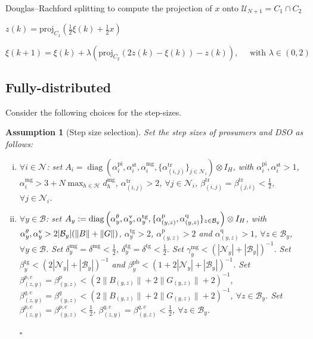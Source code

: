 \documentclass[10pt]{article}
\newtheorem{definitiox	n}{Definition}{\it}{}
\newtheorem{assumption}{Assumption}{\it}{}
\newcommand{\mc}{\mathcal}
\newcommand{\proj}{\mathrm{proj}}
\newcommand{\diag}{\operatorname{diag}}
\newcommand{\0}{\mathbf{0}}
\newcommand{\1}{\mathbf{1}}
\begin{document}
\begin{algorithm}[]
\caption{Douglas--Rachford splitting to compute the projection of $x$ onto $\mathcal{U}_{N+1} = C_1 \cap C_2$}
\begin{algorithmic}[1]

\smallskip
\IUC{ }

\smallskip
\State
$z(k) = \proj_{C_1}(\frac{1}{2} \xi(k) + \frac{1}{2}x)$ 


\smallskip
\State
$\xi(k+1) = \xi(k) + \lambda \left( \proj_{C_2}    (2z(k)-\xi(k)) - z(k)
\right), \quad \text{ with } \lambda \in (0,2)
$
\EndIUC

\end{algorithmic}
\end{algorithm}

\newpage

\newpage
\subsection{Fully-distributed}



Consider the following choices for the step-sizes.
\begin{assumption}[Step size selection]\label{ass:FD-SSS}
Set the step sizes of prosumers and DSO as follows:
\begin{enumerate}[(i)]
\item $\forall i \in \mc N$: set $A_i = \diag( \alpha_{i}^{\text{pi}}, \alpha_{i}^{\text{st}} , \alpha_{i}^{\text{mg}} , \{ \alpha_{(i,j)}^{\text{tr}} \}_{j \in \mc N_i} ) \otimes I_H$, with $\alpha_{i}^{\text{pi}}, \alpha_{i}^{\text{st}} > 1$, $ \alpha_{i}^{\text{mg}} > 3 + N \max_{h\in \mc H} d_h^{\text{mg}} $, $\alpha_{(i,j)}^{\text{tr}} > 2$, $\forall j \in \mc N_i$, $\beta^{\text{tr}}_{(i,j)} = \beta^{\text{tr}}_{ (j,i)} < \frac{1}{2}$, $\forall j \in \mc N_i$. 

\item $\forall y \in \mc B$: set $A_{y}:=\diag\left(
\alpha_y^{\theta},\alpha^{\text v}_y, \alpha_y^{\text{tg}},
\{ 
\alpha^\text{p}_{(y,z)}, \alpha^{\text{q}}_{(y,z)} 
\}_{z \in \mc B_y}
\right) \otimes I_H
$, with $\alpha_y^{\theta},\alpha^{\text v}_y > 2|\mc B_y |(\|B\|+\|G\|)$, $\alpha_y^{\text{tg}} > 2$, $\alpha^{\text{p}}_{(y,z)} > 2$ and $ \alpha^{\text{q}}_{(y,z)} > 1 $, $\forall z \in \mc B_y$, $ \forall y \in \mc B$. Set $\delta^{\text{mg}}_y = \delta^{\text{mg}} <\frac{1}{2}$, $\delta^{\text{tg}}_y = \delta^{\text{tg}} <\frac{1}{2}$. Set $\gamma^{\text{mg}}_y < (|\mc N_y| + |\mc B_y|)^{-1}$. Set $\beta^{\text{tg}}_y < ( 2|\mc N_y| + |\mc B_y|)^{-1}$ and $\beta_y^{\text{pb}} < (1+2|\mc N_y|+|\mc B_y|)^{-1}$.
Set $\beta^{p,c}_{(z,y)} = \beta^{p}_{ (y,z)} < (2\|B_{(y,z)}\|+2\|G_{(y,z)}\| + 2)^{-1}$, $\beta^{q,c}_{(z,y)} = \beta^{q}_{(y,z)} < ( 2\|B_{(y,z)}\|+ 2\|G_{(y,z)}\| + 2)^{-1}$, $\forall z \in \mc B_y$. Set $\beta^{p,c}_{(z,y)} = \beta^{p,c}_{ (y,z)} < \frac{1}{2}$, $\beta^{q,c}_{(z,y)} = \beta^{q,c}_{ (y,z)} < \frac{1}{2}$, $\forall z \in \mc B_y$.

{\hfill $\square$}
\end{enumerate}
\end{assumption}
\end{document}
